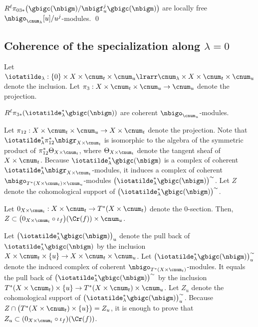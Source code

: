 \documentclass[a4,10pt]{article}
\begin{document}
\begin{cor}
\label{cor;23.4.1.2}
$R^{\ell}\pi_{03\ast}\bigl(
\gbigc(\nbigm)/\nbigf_u^j\gbigc(\nbigm)
\bigr)$
are locally free $\nbigo_{\cnum_{\lambda}}[u]/u^{j}$-modules.
\hfill\qed
\end{cor}


\subsection{Coherence of the specialization along $\lambda=0$}

Let $\iotatilde_{\lambda}:\{0\}\times X\times \cnum_t\times\cnum_u
\lrarr\cnum_{\lambda}\times X\times\cnum_t\times\cnum_u$
denote the inclusion.
Let $\pi_3:X\times\cnum_t\times\cnum_u\to\cnum_u$
denote the projection.

\begin{prop}
\label{prop;24.6.25.1}
$R^{\ell}\pi_{3\ast}(\iotatilde_{\lambda}^{\ast}\gbigc(\nbigm))$
are coherent $\nbigo_{\cnum_u}$-modules.
\end{prop}
\pf
Let $\pi_{12}:X\times\cnum_t\times\cnum_u\to X\times\cnum_t$
denote the projection.
Note that
$\iotatilde_{\lambda}^{\ast}\pi_{12}^{\ast}\nbigr_{X\times\cnum_t}$
is isomorphic to
the algebra of the symmetric product of
$\pi_{12}^{\ast}\Theta_{X\times\cnum_t}$,
where $\Theta_{X\times\cnum_t}$ denote the tangent sheaf of
$X\times\cnum_t$.
Because
$\iotatilde_{\lambda}^{\ast}\gbigc(\nbigm)$
is a complex of coherent
$\iotatilde_{\lambda}^{\ast}\nbigr_{X\times\cnum_t}$-modules,
it induces a complex of
coherent $\nbigo_{T^{\ast}(X\times\cnum_t)\times\cnum_u}$-modules
$\bigl(
\iotatilde_{\lambda}^{\ast}\gbigc(\nbigm)
\bigr)^{\sim}$.
Let $Z$ denote 
the cohomological support of
$\bigl(
\iotatilde_{\lambda}^{\ast}\gbigc(\nbigm)
\bigr)^{\sim}$.

\begin{lem}
Let $0_{X\times \cnum_t}:
X\times\cnum_t\to T^{\ast}(X\times\cnum_t)$
denote the $0$-section.
Then,
 $Z\subset
 \bigl(
 0_{X\times \cnum_t}\circ\iota_f\bigr)(\Cr(f))
 \times\cnum_u$.
\end{lem}
\pf
Let $\bigl(\iotatilde_{\lambda}^{\ast}\gbigc(\nbigm)\bigr)_u$
denote the pull back of
$\iotatilde_{\lambda}^{\ast}\gbigc(\nbigm)$
by the inclusion
$X\times \cnum_t\times\{u\}
\to X\times\cnum_t\times\cnum_u$.
Let $\bigl(
\iotatilde_{\lambda}^{\ast}\gbigc(\nbigm)
\bigr)_u^{\sim}$
denote the induced complex of
coherent $\nbigo_{T^{\ast}(X\times\cnum_t)}$-modules.
It equals the pull back of
$\bigl(
\iotatilde_{\lambda}^{\ast}\gbigc(\nbigm)
\bigr)^{\sim}$
by the inclusion
$T^{\ast}(X\times\cnum_t)\times\{u\}\to
T^{\ast}(X\times\cnum_t)\times\cnum_u$.
Let $Z_u$ denote the cohomological support of
$\bigl(
\iotatilde_{\lambda}^{\ast}\gbigc(\nbigm)
\bigr)_u^{\sim}$.
Because
$Z\cap\bigl(
T^{\ast}(X\times\cnum_t)\times\{u\}\bigr)
=Z_u$,
it is enough to prove that
$Z_u\subset (0_{X\times\cnum_t}\circ\iota_f)(\Cr(f))$.
\end{document}

